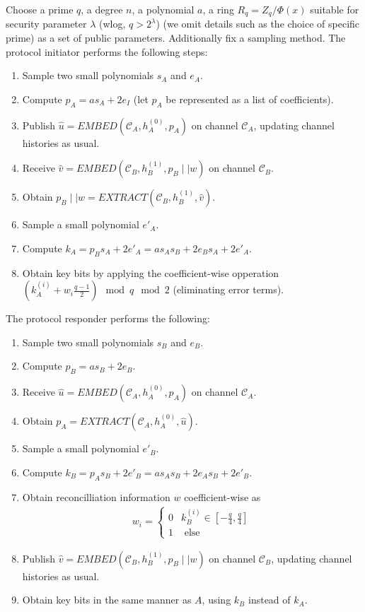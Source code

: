 \documentclass{article}
\begin{document}
Choose a prime $q$, a degree $n$, a polynomial $a$, a ring $R_q=Z_q/\Phi(x)$ suitable for security 
parameter $\lambda$ (wlog, $q > 2^\lambda$) (we omit details such as the choice 
of specific prime) as a set of public parameters.  Additionally fix a sampling method.
\newline\newline
\noindent The protocol initiator performs the following steps:
\begin{enumerate}
\item{Sample two small polynomials $s_A$ and $e_A$.}
\item{Compute $p_A = as_A + 2e_I$ (let $p_A$ be represented as a list of coefficients).}
\item{Publish $\hat{u} = EMBED(\mathcal{C}_A, h_A^{(0)}, p_A)$ on channel $\mathcal{C}_A$, updating 
channel histories as usual.}
\item{Receive $\hat{v} = EMBED(\mathcal{C}_B, h_B^{(1)}, p_B\mid \mid w)$ on channel $\mathcal{C}_B$.}
\item{Obtain $p_B\mid\mid w = EXTRACT(\mathcal{C}_B, h_B^{(1)}, \hat{v})$.}
\item{Sample a small polynomial $e'_A$.}
\item{Compute $k_A = p_B s_A + 2e'_A = as_As_B + 2e_Bs_A + 2e'_A$.}
\item{Obtain key bits by applying the coefficient-wise opperation $(k_A^{(i)} + w_i \frac{q-1}{2}) \mod q \mod 2$
(eliminating error terms).}
\end{enumerate}

\noindent The protocol responder performs the following:
\begin{enumerate}
\item{Sample two small polynomials $s_B$ and $e_B$.}
\item{Compute $p_B = as_B + 2e_B$.}
\item{Receive $\hat{u} = EMBED(\mathcal{C}_A, h_A^{(0)}, p_A)$ on channel $\mathcal{C}_A$.}
\item{Obtain $p_A = EXTRACT(\mathcal{C}_A, h_A^{(0)}, \hat{u})$.}
\item{Sample a small polynomial $e'_B$.}
\item{Compute $k_B = p_A s_B + 2e'_B = as_As_B + 2e_As_B + 2e'_B$.}
\item{Obtain reconcilliation information $w$ coefficient-wise as
\begin{align*} w_i = \begin{cases} 
0 & k_B^{(i)} \in [-\frac{q}{4}, \frac{q}{4}] \\ 
1 & \text{ else}\end{cases} 
\end{align*}
}
\item{Publish $\hat{v} = EMBED(\mathcal{C}_B, h_B^{(1)}, p_B\mid \mid w)$ on channel $\mathcal{C}_B$, 
updating channel histories as usual.}
\item{Obtain key bits in the same manner as $A$, using $k_B$ instead of $k_A$.}
\end{enumerate}
\end{document}

